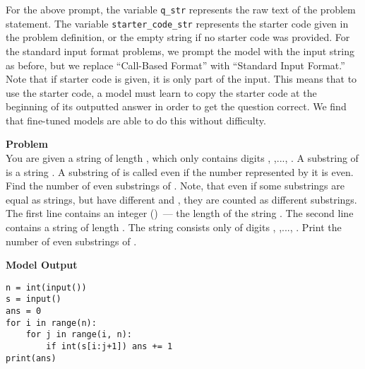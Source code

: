 \documentclass{article}
\begin{document}
For the above prompt, the variable \verb|q_str| represents the raw text of the problem statement. The variable \verb|starter_code_str| represents the starter code given in the problem definition, or the empty string if no starter code was provided. For the standard input format problems, we prompt the model with the input string as before, but we replace ``Call-Based Format'' with ``Standard Input Format.'' Note that if starter code is given, it is only part of the input. This means that to use the starter code, a model must learn to copy the starter code at the beginning of its outputted answer in order to get the question correct. We find that fine-tuned models are able to do this without difficulty.




















\begin{figure*}
    \textbf{Problem} \\
     You are given a string  of length , which only contains digits , ,..., . A substring  of  is a string . A substring  of  is called even if the number represented by it is even. Find the number of even substrings of . Note, that even if some substrings are equal as strings, but have different  and , they are counted as different substrings. The first line contains an integer  () — the length of the string . The second line contains a string  of length . The string  consists only of digits , ,..., . Print the number of even substrings of .

 

 \textbf{Model Output}
 \begin{verbatim}
n = int(input())
s = input()
ans = 0
for i in range(n):
    for j in range(i, n):
        if int(s[i:j+1]) ans += 1
print(ans)
 \end{verbatim}

\caption{Model-generated code from GPT-2 1.5B. 18/18 test cases pass for the problem. Note that models were given in problems exactly as they they are formatted here, which even meant parsing \LaTeX. For brevity, we exclude formatting instructions from this depicted problem.}
    \label{fig:samples_from_1500}
\end{figure*}
\end{document}
